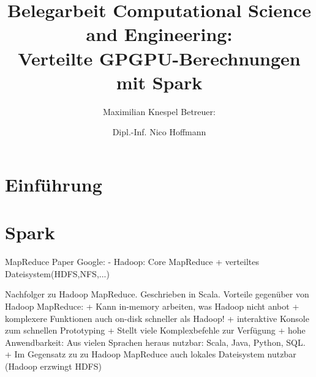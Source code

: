 \title{Belegarbeit Computational Science and Engineering:\\
       Verteilte GPGPU-Berechnungen mit Spark }
\author {
	Maximilian Knespel
	\newline	\newline
	Betreuer: \and Dipl.-Inf. Nico Hoffmann
}
\date{}




\begin{frame}
	\titlepage
\end{frame}



\section{Einführung}



\section{Spark}


\begin{frame}
MapReduce Paper Google:
 -
Hadoop: Core MapReduce + verteiltes Dateisystem(HDFS,NFS,...)

Nachfolger zu Hadoop MapReduce. Geschrieben in Scala.
Vorteile gegenüber von Hadoop MapReduce:
  + Kann in-memory arbeiten, was Hadoop nicht anbot
  + komplexere Funktionen auch on-disk schneller als Hadoop!
  + interaktive Konsole zum schnellen Prototyping
  + Stellt viele Komplexbefehle zur Verfügung
  + hohe Anwendbarkeit: Aus vielen Sprachen heraus nutzbar: Scala, Java, Python, SQL.
  + Im Gegensatz zu zu Hadoop MapReduce auch lokales Dateisystem nutzbar (Hadoop erzwingt HDFS)
\end{frame}

